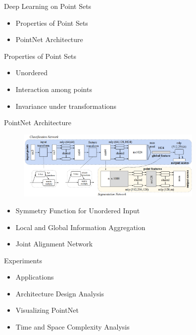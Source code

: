 \documentclass[serif,mathserif]{beamer}
\begin{document}
\begin{frame}{Deep Learning on Point Sets}
	\begin{itemize}
		\item Properties of Point Sets
		\item PointNet Architecture
	\end{itemize}
\end{frame}

\begin{frame}{Properties of Point Sets}
	\begin{itemize}
		\item Unordered
		\item Interaction among points
		\item Invariance under transformations
	\end{itemize}
\end{frame}

\begin{frame}{PointNet Architecture}
	\begin{figure}
		\includegraphics[width=9cm]{image/pointnet_arch.jpg}
	\end{figure}
	\begin{itemize}
		\item Symmetry Function for Unordered Input
		\item Local and Global Information Aggregation
		\item Joint Alignment Network
	\end{itemize}
\end{frame}

\begin{frame}{Experiments}
	\begin{itemize}
		\item Applications
		\item Architecture Design Analysis
		\item Visualizing PointNet
		\item Time and Space Complexity Analysis
	\end{itemize}
\end{frame}
\end{document}
